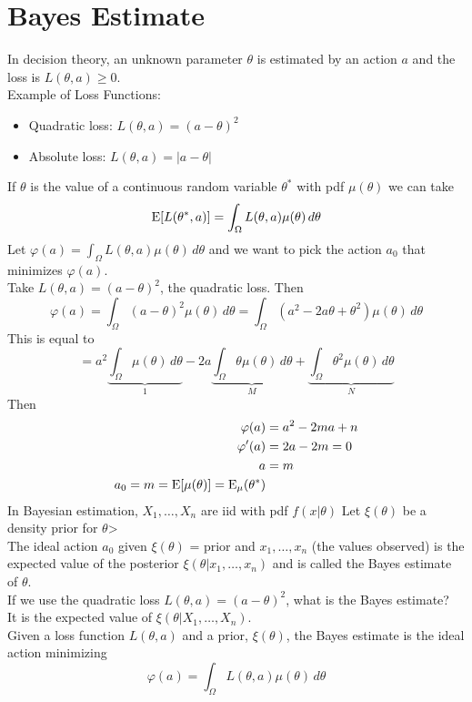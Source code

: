 \documentclass[12pt]{article}
\begin{document}
\section{Bayes Estimate}
In decision theory, an unknown parameter $\theta$ is estimated by an action $a$ and the loss is $L(\theta, a) \geq 0$.\\
Example of Loss Functions: \begin{itemize} 
\item Quadratic loss: $L(\theta,a) = (a - \theta)^2$
\item Absolute loss: $L(\theta, a) = |a - \theta| $ 
\end{itemize} 
If $\theta$ is the value of a continuous random variable $\theta^*$ with pdf $\mu(\theta)$ we can take $$\mathrm{E}[ L(\theta^*,a) ] = \int_{\Omega} L(\theta,a) \mu(\theta) \, d\theta $$ 
Let $\varphi(a) = \int_\Omega L(\theta,a)\mu(\theta) \, d\theta$ and we want to pick the action $a_0$ that minimizes $\varphi(a)$. \\
Take $L(\theta,a) = (a - \theta)^2$, the quadratic loss. Then $$ \varphi(a) = \int_\Omega (a - \theta)^2 \mu(\theta) \, d\theta = \int_\Omega (a^2 - 2a\theta + \theta^2) \mu(\theta) \, d\theta $$ 
This is equal to $$ = a^2\underbrace{\int_\Omega \mu(\theta) \, d\theta}_{1} - 2a \underbrace{\int_\Omega \theta \mu(\theta) \, d\theta}_{M} + \underbrace{\int_\Omega \theta^2 \mu(\theta) \, d\theta}_N$$ 
Then $$ \begin{aligned} \varphi(a) &= a^2 - 2ma + n \\ \varphi'(a) &= 2a - 2m = 0 \\ a &= m \\ a_0 = m = \mathrm{E}[ \mu(\theta) ] = \mathrm{E}_\mu(\theta^*) \end{aligned} $$ 
In Bayesian estimation, $X_1,\dots,X_n$ are iid with pdf $f(x|\theta)$ Let $\xi(\theta)$ be a density prior for $\theta$> \\
The ideal action $a_0$ given $\xi(\theta)$ = prior and $x_1,\dots,x_n$ (the values observed) is the expected value of the posterior $\xi(\theta | x_1,\dots,x_n)$ and is called the Bayes estimate of $\theta$. \\
If we use the quadratic loss $L(\theta,a) = (a - \theta)^2$, what is the Bayes estimate? \\
It is the expected value of $\xi(\theta | X_1,\dots,X_n)$. \\
 Given a loss function $L(\theta,a)$ and a prior, $\xi(\theta)$, the Bayes estimate is the ideal action minimizing $$ \varphi(a) = \int_\Omega L(\theta,a) \mu(\theta) \, d\theta$$ \\~\\
\end{document}
